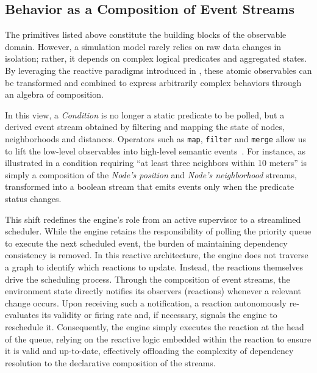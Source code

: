 \subsection{Behavior as a Composition of Event
	Streams}\label{ssec:behviour_comopsition_ev_straems}
The primitives listed above constitute the building blocks of the observable
domain. However, a simulation model rarely relies on raw data changes in
isolation; rather, it depends on complex logical predicates and aggregated
states. By leveraging the reactive paradigms introduced in
, these atomic observables can be transformed and
combined to express arbitrarily complex behaviors through an algebra of
composition.

In this view, a \emph{Condition} is no longer a static predicate to be polled,
but a derived event stream obtained by filtering and mapping the state of
nodes, neighborhoods and distances. Operators such as \texttt{map},
\texttt{filter} and \texttt{merge} allow us to lift the low-level observables
into high-level semantic events~\cite{bainomugisha2013SRP}. For instance, as
illustrated in a condition requiring ``at least
three neighbors within 10 meters'' is simply a composition of the \emph{Node's
	position} and \emph{Node's neighborhood} streams, transformed into a boolean
stream that emits events only when the predicate status changes.


This shift redefines the engine's role from an active supervisor to a
streamlined scheduler. While the engine retains the responsibility of polling
the priority queue to execute the next scheduled event, the burden of
maintaining dependency consistency is removed. In this reactive architecture,
the engine does not traverse a graph to identify which reactions to update.
Instead, the reactions themselves drive the scheduling process. Through the
composition of event streams, the environment state directly notifies its
observers (reactions) whenever a relevant change occurs. Upon receiving such a
notification, a reaction autonomously re-evaluates its validity or firing rate
and, if necessary, signals the engine to reschedule it. Consequently, the
engine simply executes the reaction at the head of the queue, relying on the
reactive logic embedded within the reaction to ensure it is valid and
up-to-date, effectively offloading the complexity of dependency resolution to
the declarative composition of the streams.

